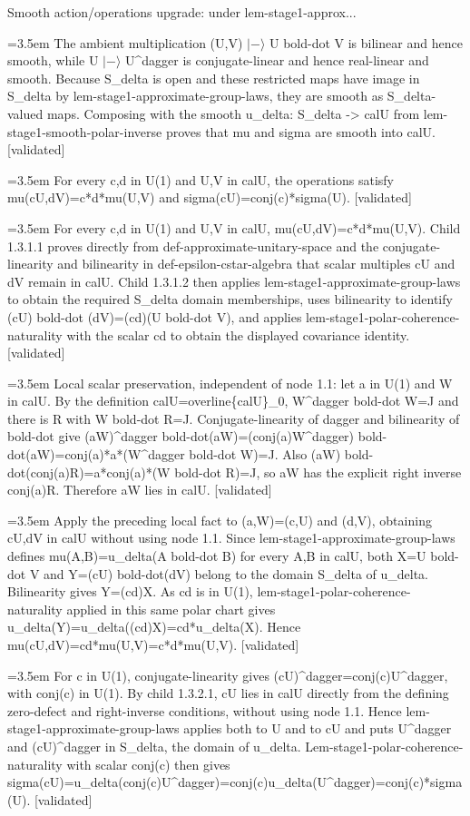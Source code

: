 \documentclass{article}
\newcommand{\step}[1]{\par\noindent\hangindent=3.5em\hangafter=1%
  \makebox[3.5em][l]{\textbf{#1.}}}
\newcommand{\steptag}[1]{\hfill{\small\textsf{[#1]}}}
\begin{document}
\begin{proofbox}{Smooth action/operations upgrade: under lem-stage1-approx...}
\step{1.2.2} The ambient multiplication (U,V) $|-\rangle$ U bold-dot V is bilinear and hence smooth, while U $|-\rangle$ U\textasciicircum{}dagger is conjugate-linear and hence real-linear and smooth. Because S\_delta is open and these restricted maps have image in S\_delta by lem-stage1-approximate-group-laws, they are smooth as S\_delta-valued maps. Composing with the smooth u\_delta: S\_delta -> calU from lem-stage1-smooth-polar-inverse proves that mu and sigma are smooth into calU. \steptag{validated} \\[4pt]
\step{1.3} For every c,d in U(1) and U,V in calU, the operations satisfy mu(cU,dV)=c*d*mu(U,V) and sigma(cU)=conj(c)*sigma(U). \steptag{validated} \\[6pt]
\step{1.3.1} For every c,d in U(1) and U,V in calU, mu(cU,dV)=c*d*mu(U,V). Child 1.3.1.1 proves directly from def-approximate-unitary-space and the conjugate-linearity and bilinearity in def-epsilon-cstar-algebra that scalar multiples cU and dV remain in calU. Child 1.3.1.2 then applies lem-stage1-approximate-group-laws to obtain the required S\_delta domain memberships, uses bilinearity to identify (cU) bold-dot (dV)=(cd)(U bold-dot V), and applies lem-stage1-polar-coherence-naturality with the scalar cd to obtain the displayed covariance identity. \steptag{validated} \\[6pt]
\step{1.3.1.1} Local scalar preservation, independent of node 1.1: let a in U(1) and W in calU. By the definition calU=overline\{calU\}\_0, W\textasciicircum{}dagger bold-dot W=J and there is R with W bold-dot R=J. Conjugate-linearity of dagger and bilinearity of bold-dot give (aW)\textasciicircum{}dagger bold-dot(aW)=(conj(a)W\textasciicircum{}dagger) bold-dot(aW)=conj(a)*a*(W\textasciicircum{}dagger bold-dot W)=J. Also (aW) bold-dot(conj(a)R)=a*conj(a)*(W bold-dot R)=J, so aW has the explicit right inverse conj(a)R. Therefore aW lies in calU. \steptag{validated} \\[4pt]
\step{1.3.1.2} Apply the preceding local fact to (a,W)=(c,U) and (d,V), obtaining cU,dV in calU without using node 1.1. Since lem-stage1-approximate-group-laws defines mu(A,B)=u\_delta(A bold-dot B) for every A,B in calU, both X=U bold-dot V and Y=(cU) bold-dot(dV) belong to the domain S\_delta of u\_delta. Bilinearity gives Y=(cd)X. As cd is in U(1), lem-stage1-polar-coherence-naturality applied in this same polar chart gives u\_delta(Y)=u\_delta((cd)X)=cd*u\_delta(X). Hence mu(cU,dV)=cd*mu(U,V)=c*d*mu(U,V). \steptag{validated} \\[4pt]
\step{1.3.2} For c in U(1), conjugate-linearity gives (cU)\textasciicircum{}dagger=conj(c)U\textasciicircum{}dagger, with conj(c) in U(1). By child 1.3.2.1, cU lies in calU directly from the defining zero-defect and right-inverse conditions, without using node 1.1. Hence lem-stage1-approximate-group-laws applies both to U and to cU and puts U\textasciicircum{}dagger and (cU)\textasciicircum{}dagger in S\_delta, the domain of u\_delta. Lem-stage1-polar-coherence-naturality with scalar conj(c) then gives sigma(cU)=u\_delta(conj(c)U\textasciicircum{}dagger)=conj(c)u\_delta(U\textasciicircum{}dagger)=conj(c)*sigma(U). \steptag{validated} \\[6pt]

\end{proofbox}
\end{document}
